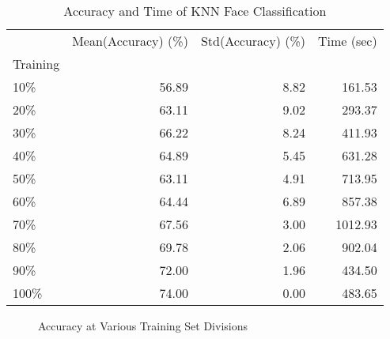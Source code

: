 \documentclass[10pt,parskip=half,
toc=sectionentrywithdots,
bibliography=totocnumbered,
captions=tableheading,numbers=noendperiod]{scrartcl}
\begin{document}
\begin{table}[H]
\caption{Accuracy and Time of KNN Face Classification}\label{tbl:tlabel}
\centering
\begin{adjustbox}{max width=\textwidth}
\begin{tabular}{lrrr}
\toprule
{} &  Mean(Accuracy) (\%) &  Std(Accuracy) (\%) &  Time (sec) \\
Training &                     &                    &             \\
\midrule
10\%      &               56.89 &               8.82 &      161.53 \\
20\%      &               63.11 &               9.02 &      293.37 \\
30\%      &               66.22 &               8.24 &      411.93 \\
40\%      &               64.89 &               5.45 &      631.28 \\
50\%      &               63.11 &               4.91 &      713.95 \\
60\%      &               64.44 &               6.89 &      857.38 \\
70\%      &               67.56 &               3.00 &     1012.93 \\
80\%      &               69.78 &               2.06 &      902.04 \\
90\%      &               72.00 &               1.96 &      434.50 \\
100\%     &               74.00 &               0.00 &      483.65 \\
\bottomrule
\end{tabular}

\end{adjustbox}
\end{table}

\begin{figure}[H]\begin{center}\end{center}\caption{Accuracy at Various Training Set Divisions}\label{fig:flabel}\end{figure}
\end{document}
